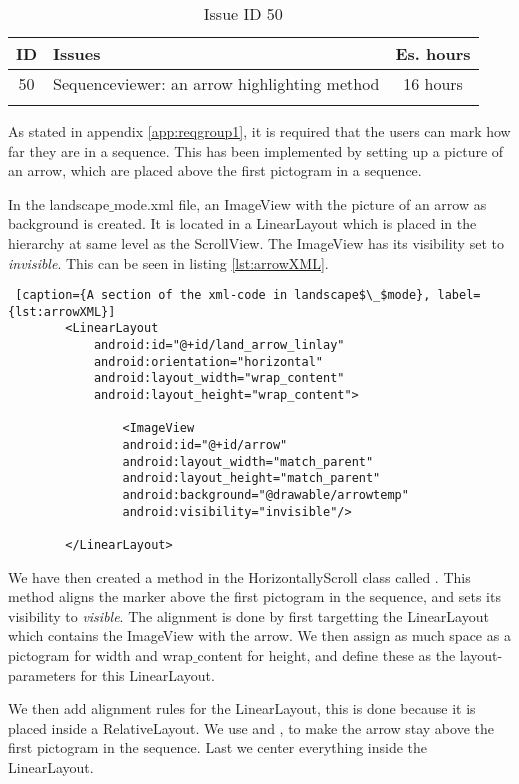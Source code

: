 \begin{longtable} { | c | p{12cm} | c | } 
\hline
	ID 	&	Issues	&		 Es. hours \\\hline
	50 	&	Sequenceviewer: an arrow highlighting method	&	16 hours \\\hline
\caption{Issue ID 50}
\label{tab:spr3_SVarrowhighlight}
\end{longtable}

As stated in appendix \ref{app:reqgroup1}, it is required that the users can mark how far they are in a sequence. This has been implemented by setting up a picture of an arrow, which are placed above the first pictogram in a sequence.

In the landscape$\_$mode.xml file, an ImageView with the picture of an arrow as background is created. It is located in a LinearLayout which is placed in the hierarchy at same level as the ScrollView. The ImageView has its visibility set to \textit{invisible}. This can be seen in listing \ref{lst:arrowXML}.

\begin{lstlisting} [caption={A section of the xml-code in landscape$\_$mode}, label={lst:arrowXML}]
        <LinearLayout
            android:id="@+id/land_arrow_linlay"
            android:orientation="horizontal"
            android:layout_width="wrap_content"
            android:layout_height="wrap_content">

                <ImageView
                android:id="@+id/arrow"
                android:layout_width="match_parent"
                android:layout_height="match_parent"
                android:background="@drawable/arrowtemp"
                android:visibility="invisible"/>
                
        </LinearLayout>
\end{lstlisting}

We have then created a method in the HorizontallyScroll class called . This method aligns the marker above the first pictogram in the sequence, and sets its visibility to \textit{visible}. The alignment is done by first targetting the LinearLayout which contains the ImageView with the arrow. We then assign as much space as a pictogram for width and wrap$\_$content for height, and define these as the layout-parameters for this LinearLayout.

We then add alignment rules for the LinearLayout, this is done because it is placed inside a RelativeLayout. We use  and , to make the arrow stay above the first pictogram in the sequence. Last we center everything inside the LinearLayout.

